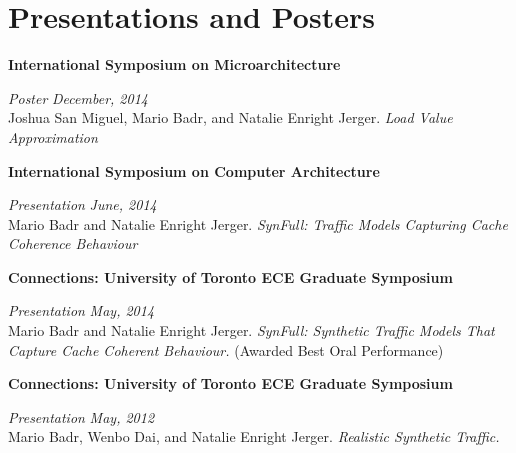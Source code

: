 \section{\sc Presentations and Posters}

{\bf International Symposium on Microarchitecture}
\vspace{-.3cm}

{\em Poster} \hfill {\em December, 2014}\\
Joshua San Miguel, Mario Badr, and Natalie Enright Jerger. \textit{Load Value Approximation}

{\bf International Symposium on Computer Architecture}
\vspace{-.3cm}

{\em Presentation} \hfill {\em June, 2014}\\
Mario Badr and Natalie Enright Jerger. \textit{SynFull: Traffic Models Capturing Cache Coherence Behaviour}

{\bf Connections: University of Toronto ECE Graduate Symposium}
\vspace{-.3cm}

{\em Presentation} \hfill {\em May, 2014}\\
Mario Badr and Natalie Enright Jerger. \textit{SynFull: Synthetic Traffic Models That Capture Cache Coherent Behaviour.} (Awarded Best Oral Performance)

{\bf Connections: University of Toronto ECE Graduate Symposium}
\vspace{-.3cm}

{\em Presentation} \hfill {\em May, 2012}\\
Mario Badr, Wenbo Dai, and Natalie Enright Jerger. \textit{Realistic Synthetic Traffic.}